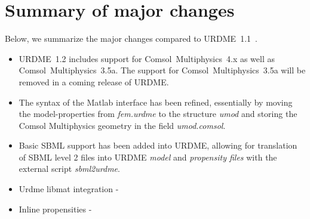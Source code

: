 \section{Summary of major changes}
\label{sec:changes}

Below, we summarize the major changes compared to
URDME~1.1~\cite{URDMEman2}.
\begin{itemize}
\item URDME~1.2 includes support for Comsol~Multiphysics~4.x as well
  as Comsol~Multiphysics~3.5a. The support for
  Comsol~Multiphysics~3.5a will be removed in a coming release of
  URDME.

\item The syntax of the Matlab interface has been refined, essentially
  by moving the model-properties from \textit{fem.urdme} to the
  structure \textit{umod} and storing the Comsol Multiphysics geometry
  in the field \textit{umod.comsol}.

\item Basic SBML support has been added into URDME, allowing for
  translation of SBML level 2 files into URDME \textit{model} and
  \textit{propensity files} with the external script
  \textit{sbml2urdme}.

\item Urdme libmat integration - 

\item Inline propensities - 

\end{itemize}
